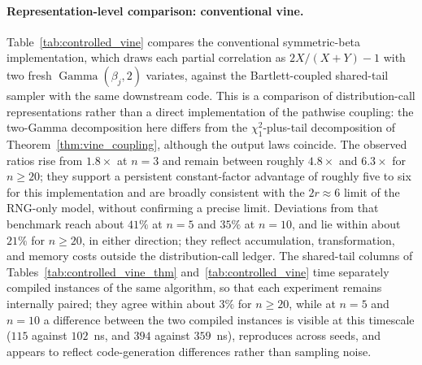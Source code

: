 \documentclass[12pt,english]{article}
\theoremstyle{plain} %
\theoremstyle{definition} %
\theoremstyle{remark} %
\begin{document}
\paragraph{Representation-level comparison: conventional vine.}
Table~\ref{tab:controlled_vine} compares the conventional symmetric-beta implementation, which draws each partial correlation as $2X/(X+Y)-1$ with two fresh $\operatorname{Gamma}(\beta_j,2)$ variates, against the Bartlett-coupled shared-tail sampler with the same downstream code. This is a comparison of distribution-call representations rather than a direct implementation of the pathwise coupling: the two-Gamma decomposition here differs from the $\chi^2_1$-plus-tail decomposition of Theorem~\ref{thm:vine_coupling}, although the output laws coincide. The observed ratios rise from $1.8\times$ at $n=3$ and remain between roughly $4.8\times$ and $6.3\times$ for $n\geq20$; they support a persistent constant-factor advantage of roughly five to six for this implementation and are broadly consistent with the $2r\approx6$ limit of the RNG-only model, without confirming a precise limit. Deviations from that benchmark reach about $41\%$ at $n=5$ and $35\%$ at $n=10$, and lie within about $21\%$ for $n\geq20$, in either direction; they reflect accumulation, transformation, and memory costs outside the distribution-call ledger. The shared-tail columns of Tables~\ref{tab:controlled_vine_thm} and~\ref{tab:controlled_vine} time separately compiled instances of the same algorithm, so that each experiment remains internally paired; they agree within about $3\%$ for $n\geq20$, while at $n=5$ and $n=10$ a difference between the two compiled instances is visible at this timescale ($115$ against $102$~ns, and $394$ against $359$~ns), reproduces across seeds, and appears to reflect code-generation differences rather than sampling noise.
\end{document}
